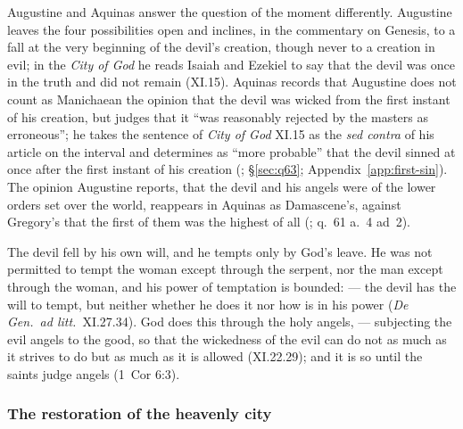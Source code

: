 Augustine and Aquinas answer the question of the moment differently.
Augustine leaves the four possibilities open and inclines, in the
commentary on Genesis, to a fall at the very beginning of the devil's
creation, though never to a creation in evil; in the \emph{City of God}
he reads Isaiah and Ezekiel to say that the devil was once in the truth
and did not remain (XI.15). Aquinas records that Augustine does not count
as Manichaean the opinion that the devil was wicked from the first instant of his
creation, but judges that it ``was reasonably rejected by the masters as
erroneous''; he takes the sentence of \emph{City of
God} XI.15 as the \emph{sed contra} of his article on the interval and
determines as ``more probable'' that the devil sinned at once after the
first instant of his creation (; \S\ref{sec:q63};
Appendix~\ref{app:first-sin}). The opinion Augustine
reports, that the devil and his angels were of the lower orders set over
the world, reappears in Aquinas as Damascene's, against Gregory's that the
first of them was the highest of all (; q.~61 a.~4
ad~2).

The devil fell by his own will, and he tempts only by God's leave. He
was not permitted to tempt the woman except through the serpent, nor the
man except through the woman, and his power of temptation is bounded:
 --- the devil has the will to tempt,
but neither whether he does it nor how is in his power (\emph{De Gen.\ ad
litt.}\ XI.27.34). God does this through the holy angels,  --- subjecting the evil angels to the
good, so that the wickedness of the evil can do not as much as it strives
to do but as much as it is allowed (XI.22.29); and it is so until the
saints judge angels (1~Cor 6:3).

\subsubsection{The restoration of the heavenly city}\label{sec:aug-restoration}

